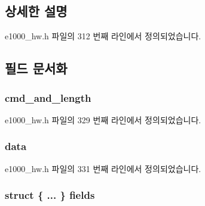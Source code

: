 \subsection{상세한 설명}


e1000\+\_\+hw.\+h 파일의 312 번째 라인에서 정의되었습니다.



\subsection{필드 문서화}
\subsubsection[{\texorpdfstring{cmd\+\_\+and\+\_\+length}{cmd_and_length}}]{ cmd\+\_\+and\+\_\+length}\hypertarget{structe1000__context__desc_a09cba9df700226699b67608dd9a130af}{}\label{structe1000__context__desc_a09cba9df700226699b67608dd9a130af}


e1000\+\_\+hw.\+h 파일의 329 번째 라인에서 정의되었습니다.

\subsubsection[{\texorpdfstring{data}{data}}]{ data}\hypertarget{structe1000__context__desc_afc5d3d82c86bd8827a6251a93986acf8}{}\label{structe1000__context__desc_afc5d3d82c86bd8827a6251a93986acf8}


e1000\+\_\+hw.\+h 파일의 331 번째 라인에서 정의되었습니다.

\subsubsection[{\texorpdfstring{fields}{fields}}]{\setlength{\rightskip}{0pt plus 5cm}struct \{ ... \}   fields}\hypertarget{structe1000__context__desc_a3878dbf8513c090f6318385de4a3574b}{}\label{structe1000__context__desc_a3878dbf8513c090f6318385de4a3574b}
